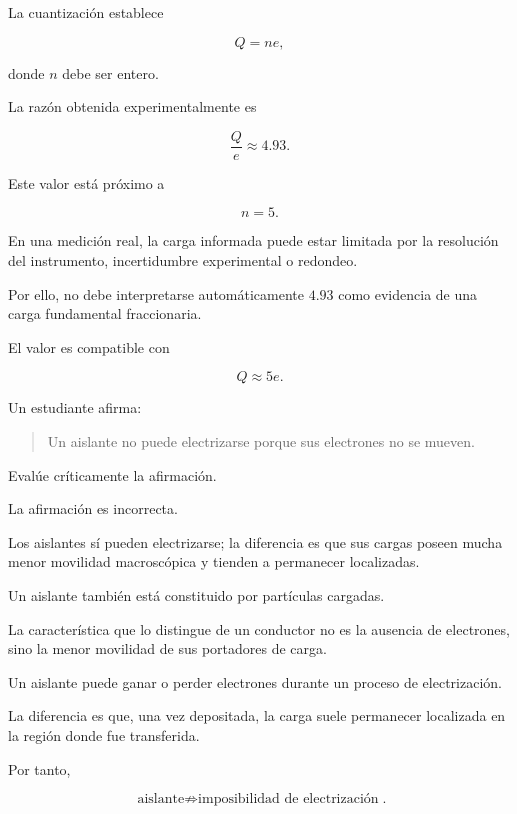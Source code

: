 \begin{explicacion}

La cuantización establece

\[
Q=ne,
\]

donde \(n\) debe ser entero.

La razón obtenida experimentalmente es

\[
\frac{Q}{e}\approx4.93.
\]

Este valor está próximo a

\[
n=5.
\]

En una medición real, la carga informada puede estar limitada por la
resolución del instrumento, incertidumbre experimental o redondeo.

Por ello, no debe interpretarse automáticamente \(4.93\) como evidencia de
una carga fundamental fraccionaria.

El valor es compatible con

\[
Q\approx5e.
\]

\end{explicacion}



\begin{ejercicio}

Un estudiante afirma:

\begin{quote}
Un aislante no puede electrizarse porque sus electrones no se mueven.
\end{quote}

Evalúe críticamente la afirmación.

\end{ejercicio}

\begin{respuesta}

La afirmación es incorrecta.

Los aislantes sí pueden electrizarse; la diferencia es que sus cargas poseen
mucha menor movilidad macroscópica y tienden a permanecer localizadas.

\end{respuesta}

\begin{explicacion}

Un aislante también está constituido por partículas cargadas.

La característica que lo distingue de un conductor no es la ausencia de
electrones, sino la menor movilidad de sus portadores de carga.

Un aislante puede ganar o perder electrones durante un proceso de
electrización.

La diferencia es que, una vez depositada, la carga suele permanecer
localizada en la región donde fue transferida.

Por tanto,

\[
\boxed{
\text{aislante}
\not\Rightarrow
\text{imposibilidad de electrización}
}.
\]

\end{explicacion}


